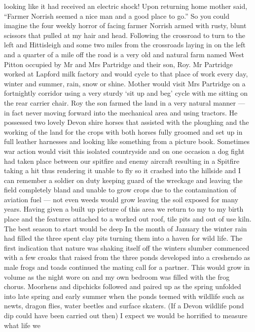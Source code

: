 looking like it had received an electric shock!  Upon returning home mother
said, ``Farmer Norrish seemed a nice man and a good place to go.''  So you
could imagine the four weekly horror of facing farmer Norrish armed with rusty,
blunt scissors that pulled at my hair and head. Following the crossroad to turn
to the left and Hittisleigh and some two miles from the crossroads laying in on
the left and a quarter of a mile off the road is a very old and natural farm
named West Pitton occupied by Mr and Mrs Partridge and their son, Roy. Mr
Partridge worked at Lapford milk factory and would cycle to that place of work
every day, winter and summer, rain, snow or shine. Mother would visit Mrs
Partridge on a fortnightly corridor using a very sturdy ‘sit up and beg’ cycle
with me sitting on the rear carrier chair. Roy the son farmed the land in a
very natural manner — in fact never moving forward into the mechanical area and
using tractors. He possessed two lovely Devon shire horses that assisted with
the ploughing and the working of the land for the crops with both horses fully
groomed and set up in full leather harnesses and looking like something from a
picture book. Sometimes war action would visit this isolated countryside and on
one occasion a dog fight had taken place between our spitfire and enemy
aircraft resulting in a Spitfire taking a hit thus rendering it unable to fly
so it crashed into the hillside and I can remember a soldier on duty keeping
guard of the wreckage and leaving the field completely bland and unable to grow
crops due to the contamination of aviation fuel — not even weeds would grow
leaving the soil exposed for many years. Having given a built up picture of
this area we return to my to my birth place and the features attached to a
worked out roof, tile pits and out of use kiln. The best season to start would
be deep In the month of January the winter rain had filled the three spent clay
pits turning them into a haven for wild life. The first indication that nature
was shaking itself off the winters slumber commenced with a few croaks that
raised from the three ponds developed into a creshendo as male frogs and toads
continued the mating call for a partner. This would grow in volume as the night
wore on and my own bedroom was filled with the frog chorus. Moorhens and
dipchicks followed and paired up as the spring unfolded into late spring and
early summer when the ponds teemed with wildlife such as newts, dragon flies,
water beetles and surface skaters. (If a Devon wildlife pond dip could have
been carried out then) I expect we would be horrified to measure what life we
